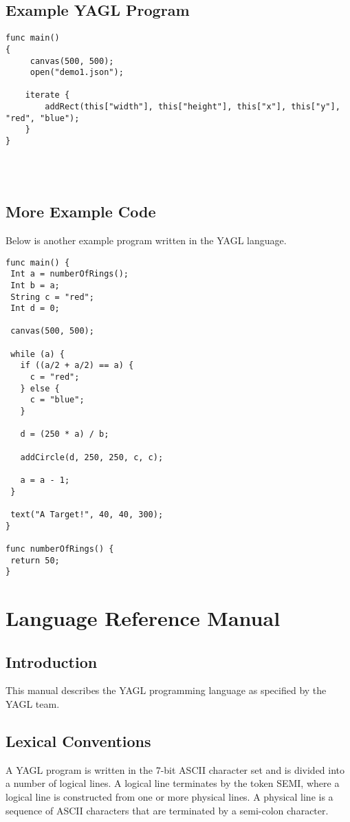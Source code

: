 \documentclass[12pt]{article}
\begin{document}
\subsection{Example YAGL Program}
\begin{lstlisting}
func main()
{
     canvas(500, 500);
     open("demo1.json");

	iterate {
		addRect(this["width"], this["height"], this["x"], this["y"], "red", "blue");
	}
}




\end{lstlisting}

\subsection{More Example Code}
Below is another example program written in the YAGL language.

\begin{lstlisting}
func main() {
 Int a = numberOfRings();
 Int b = a;
 String c = "red";
 Int d = 0;

 canvas(500, 500);

 while (a) {
   if ((a/2 + a/2) == a) {
     c = "red";
   } else {
     c = "blue";
   }

   d = (250 * a) / b;

   addCircle(d, 250, 250, c, c);

   a = a - 1;
 }

 text("A Target!", 40, 40, 300);
}

func numberOfRings() {
 return 50;
}
\end{lstlisting}

\section{Language Reference Manual}

\subsection{Introduction}
This manual describes the YAGL programming language as specified by the YAGL team. 

\subsection{Lexical Conventions}
A YAGL program is written in the 7-bit ASCII character set and is divided into a number of logical lines. A logical line terminates by the token SEMI, where a logical line is constructed from one or more physical lines. A physical line is a sequence of ASCII characters that are terminated by a semi-colon character.
\end{document}
